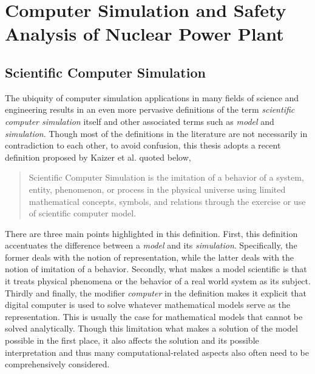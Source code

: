 \section{Computer Simulation and Safety Analysis of Nuclear Power Plant}\label{sec:intro_computer_simulation}

\subsection{Scientific Computer Simulation}\label{sub:intro_scientific_computer_simulation}

The ubiquity of computer simulation applications in many fields of science and engineering results in an even more pervasive definitions of the term \textit{scientific computer simulation} itself and other associated terms such as \textit{model} and \textit{simulation}.
Though most of the definitions in the literature are not necessarily in contradiction to each other, 
to avoid confusion, this thesis adopts a recent definition proposed by Kaizer et al.\cite{Kaizer2015} quoted below,

\begin{quote}
	Scientific Computer Simulation is the imitation of a behavior of a system, entity, phenomenon, or process in the physical universe 
	using limited mathematical concepts, symbols, and relations through the exercise or use of scientific computer model.
\end{quote}

There are three main points highlighted in this definition.
First, this definition accentuates the difference between a \emph{model} and its \emph{simulation}.
Specifically, the former deals with the notion of representation, while the latter deals with the notion of imitation of a behavior.
Secondly, what makes a model scientific is that it treats physical phenomena or the behavior of a real world system as its subject.
Thirdly and finally, the modifier \emph{computer} in the definition makes it explicit that digital computer is used to solve whatever mathematical models serve as the representation.
This is usually the case for mathematical models that cannot be solved analytically.
Though this limitation what makes a solution of the model possible in the first place, 
it also affects the solution and its possible interpretation and thus many computational-related aspects also often need to be comprehensively considered.

